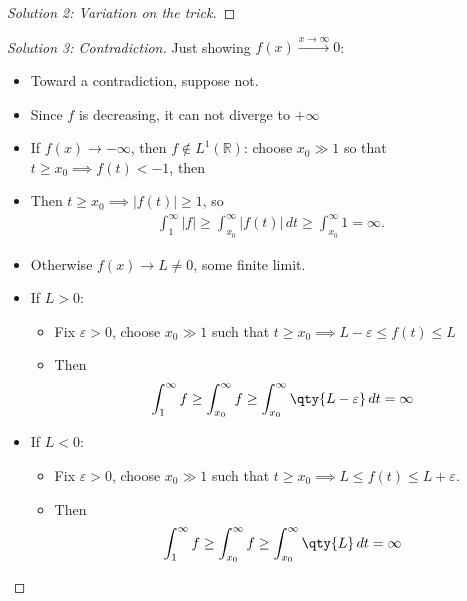 \begin{solution}[of b]
\begin{proof}[Solution 2: Variation on the trick]
\end{proof}

\begin{proof}[Solution 3: Contradiction]

Just showing \(f(x) \overset{x\to \infty}\longrightarrow 0\):

\begin{itemize}
\item
  Toward a contradiction, suppose not.
\item
  Since \(f\) is decreasing, it can not diverge to \(+\infty\)
\item
  If \(f(x) \to -\infty\), then \(f\not\in L^1({\mathbb{R}})\): choose
  \(x_0 \gg 1\) so that \(t\geq x_0 \implies f(t) < -1\), then
\item
  Then \(t\geq x_0 \implies {\left\lvert {f(t)} \right\rvert} \geq 1\),
  so
  \begin{align*}
  \int_1^\infty {\left\lvert {f} \right\rvert} \geq \int_{x_0}^\infty {\left\lvert {f(t) } \right\rvert} \, dt \geq \int_{x_0}^\infty 1 =\infty
   .\end{align*}
\item
  Otherwise \(f(x) \to L\neq 0\), some finite limit.
\item
  If \(L>0\):

  \begin{itemize}
  \tightlist
  \item
    Fix \({\varepsilon}>0\), choose \(x_0\gg 1\) such that
    \(t\geq x_0 \implies L-{\varepsilon}\leq f(t) \leq L\)
  \item
    Then
    \begin{align*}\int_1^\infty f \geq \int_{x_0}^\infty f \geq \int_{x_0}^\infty \qty{L-{\varepsilon}}\,dt = \infty\end{align*}
  \end{itemize}
\item
  If \(L<0\):

  \begin{itemize}
  \tightlist
  \item
    Fix \({\varepsilon}> 0\), choose \(x_0\gg 1\) such that
    \(t\geq x_0 \implies L \leq f(t) \leq L + {\varepsilon}\).
  \item
    Then
    \begin{align*}\int_1^\infty f \geq \int_{x_0}^\infty f \geq \int_{x_0}^\infty \qty{L}\,dt = \infty\end{align*}
  \end{itemize}
\end{itemize}


\end{proof}
\end{solution}
